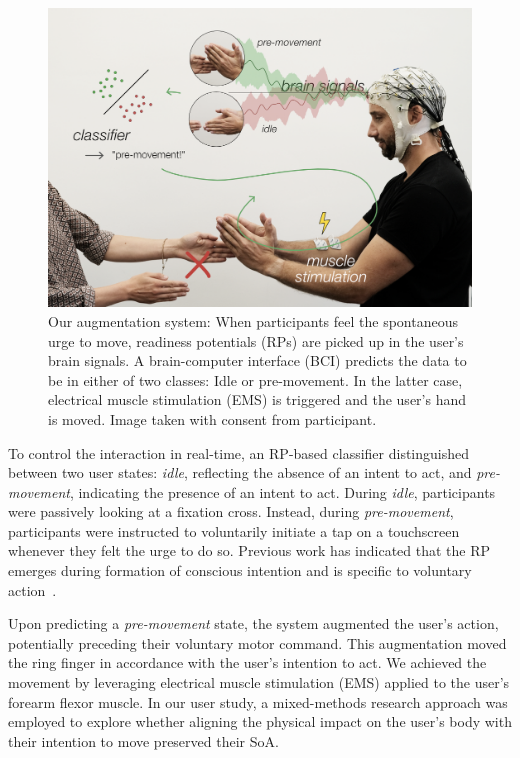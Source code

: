\begin{figure}[!h]
    \centering
    \includegraphics[width=\columnwidth]{figures/teaser_new.png}%
    \caption{Our augmentation system: When participants feel the spontaneous urge to move, readiness potentials (RPs) are picked up in the user's brain signals. A brain-computer interface (BCI) predicts the data to be in either of two classes: Idle or pre-movement. In the latter case, electrical muscle stimulation (EMS) is triggered and the user's hand is moved. Image taken with consent from participant.}
\end{figure}

To control the interaction in real-time, an RP-based classifier distinguished between two user states: \textit{idle}, reflecting the absence of an intent to act, and \textit{pre-movement}, indicating the presence of an intent to act. During \textit{idle}, participants were passively looking at a fixation cross. Instead, during \textit{pre-movement}, participants were instructed to voluntarily initiate a tap on a touchscreen whenever they felt the urge to do so. Previous work has indicated that the RP emerges during formation of conscious intention and is specific to voluntary action~\cite{Schultze-Kraft2020-rm, Travers2020-hf, Pares-Pujolras2019-ll}.

Upon predicting a \textit{pre-movement} state, the system augmented the user's action, potentially preceding their voluntary motor command. This augmentation moved the ring finger in accordance with the user's intention to act. We achieved the movement by leveraging electrical muscle stimulation (EMS) applied to the user's forearm flexor muscle. In our user study, a mixed-methods research approach was employed to explore whether aligning the physical impact on the user's body with their intention to move preserved their SoA.



